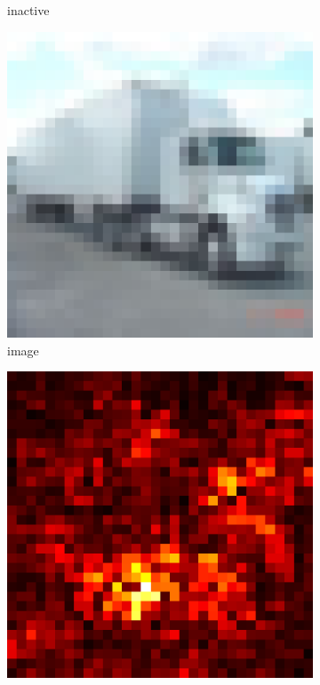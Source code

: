 \documentclass[preprint,12pt]{elsarticle}
\begin{document}
\begin{figure}
\begin{subfigure}{0.14\textwidth}
        \caption{inactive}
    \end{subfigure}
    \hfill
    \begin{subfigure}{0.14\linewidth}
        \centering
        \includegraphics[width=\linewidth]{../visualizations/examples/cifar10/cnn/images/9.png}
        \caption{image}
    \end{subfigure}
    \hfill
    \begin{subfigure}{0.14\linewidth}
        \centering
        \includegraphics[width=\linewidth]{../visualizations/examples/cifar10/cnn/saliency_map/9.png}

\end{subfigure}
\end{figure}
\end{document}
